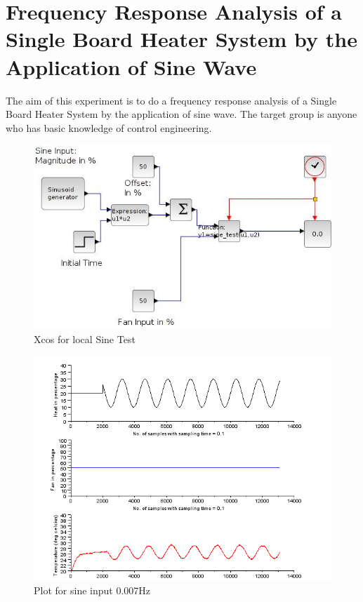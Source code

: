 \chapter{Frequency Response Analysis of a Single Board Heater System by the Application of Sine Wave}
The aim of this experiment is to do a frequency response analysis of a Single Board Heater System by the 
application of sine wave. The target group is anyone who has basic knowledge of control engineering.



\begin{figure}
\centering
\includegraphics[width=\linewidth]{sinetest_manual/sine_test.jpg}
\caption{Xcos for local Sine Test}
\label{xcos_sine}
\end{figure}

\begin{figure}
\includegraphics[width=\linewidth]{sinetest_manual/sine-007-plot.png}
\caption{Plot for sine input 0.007Hz}
\label{fig:scope}
\end{figure}

